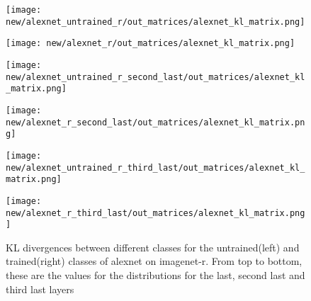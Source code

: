 \documentclass{article}
\begin{document}
            \begin{figure}[H]
                \centering
                \begin{minipage}{0.45\textwidth}
                    \centering
                    \texttt{[image: new/alexnet\_untrained\_r/out\_matrices/alexnet\_kl\_matrix.png]}
                    
                \end{minipage}\hfill
                \begin{minipage}{0.45\textwidth}
                    \centering
                    \texttt{[image: new/alexnet\_r/out\_matrices/alexnet\_kl\_matrix.png]}
                \end{minipage}
                \begin{minipage}{0.45\textwidth}
                    \centering
                    \texttt{[image: new/alexnet\_untrained\_r\_second\_last/out\_matrices/alexnet\_kl\_matrix.png]}
                    
                \end{minipage}\hfill
                \begin{minipage}{0.45\textwidth}
                    \centering
                    \texttt{[image: new/alexnet\_r\_second\_last/out\_matrices/alexnet\_kl\_matrix.png]}
                \end{minipage}
                
                \begin{minipage}{0.45\textwidth}
                    \centering
                    \texttt{[image: new/alexnet\_untrained\_r\_third\_last/out\_matrices/alexnet\_kl\_matrix.png]}
                    
                \end{minipage}\hfill
                \begin{minipage}{0.45\textwidth}
                    \centering
                    \texttt{[image: new/alexnet\_r\_third\_last/out\_matrices/alexnet\_kl\_matrix.png]}
                \end{minipage}
                
                \caption{KL divergences between different classes for the untrained(left) and trained(right) classes of alexnet on imagenet-r. From top to bottom, these are the values for the distributions for the last, second last and third last layers}
                \label{fig:kl_divergences_r}

            \end{figure}
\end{document}
